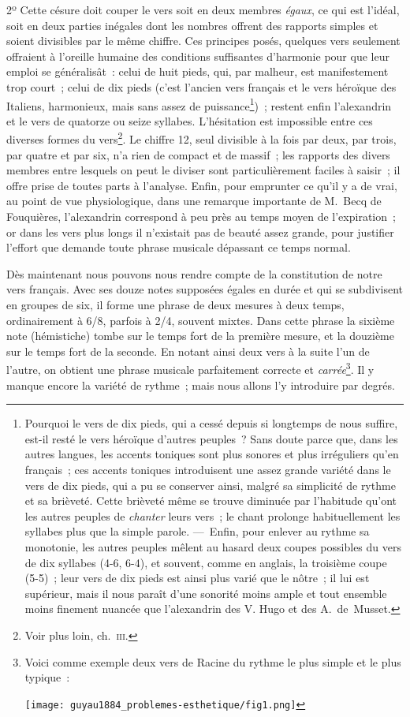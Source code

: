 \documentclass[french,twoside]{book} %
\begin{document}
2º Cette césure doit couper le vers soit en deux membres \emph{égaux}, ce qui est l’idéal, soit en deux parties inégales dont les nombres offrent des rapports simples et soient divisibles par le même chiffre.  Ces principes posés, quelques vers seulement offraient à l’oreille humaine des conditions suffisantes d’harmonie pour que leur emploi se généralisât : celui de huit pieds, qui, par malheur, est manifestement trop court ; celui de dix pieds (c’est l’ancien vers français et le vers héroïque des Italiens, harmonieux, mais sans assez de puissance\footnote{Pourquoi le vers de dix pieds, qui a cessé depuis si longtemps de nous suffire, est-il resté le vers héroïque d’autres peuples ? Sans doute parce que, dans les autres langues, les accents toniques sont plus sonores et plus irréguliers qu’en français ; ces accents toniques introduisent une assez grande variété dans le vers de dix pieds, qui a pu se conserver ainsi, malgré sa simplicité de rythme et sa brièveté. Cette brièveté même se trouve diminuée par l’habitude qu’ont les autres peuples de \emph{chanter} leurs vers ; le chant prolonge habituellement les syllabes plus que la simple parole. — Enfin, pour enlever au rythme sa monotonie, les autres peuples mêlent au hasard deux coupes possibles du vers de dix syllabes (4-6, 6-4), et souvent, comme en anglais, la troisième coupe (5-5) ; leur vers de dix pieds est ainsi plus varié que le nôtre ; il lui est supérieur, mais il nous paraît d’une sonorité moins ample et tout ensemble moins finement nuancée que l’alexandrin des V. Hugo et des A. de Musset.}) ; restent enfin l’alexandrin et le vers de quatorze ou seize syllabes. L’hésitation est impossible entre ces diverses formes du vers\footnote{Voir plus loin, ch. \textsc{iii}.}. Le chiffre 12, seul divisible à la fois par deux, par trois, par quatre et par six, n’a rien de compact et de massif ; les rapports des divers membres entre lesquels on peut le diviser sont particulièrement faciles à saisir ; il offre prise de toutes parts à l’analyse. Enfin, pour emprunter ce qu’il y a de vrai, au point de vue physiologique, dans une remarque importante de M. Becq de Fouquières, l’alexandrin correspond à peu près au temps moyen de l’expiration ; or dans les vers  plus longs il n’existait pas de beauté assez grande, pour justifier l’effort que demande toute phrase musicale dépassant ce temps normal.\par
Dès maintenant nous pouvons nous rendre compte de la constitution de notre vers français. Avec ses douze notes supposées égales en durée et qui se subdivisent en groupes de six, il forme une phrase de deux mesures à deux temps, ordinairement à 6/8, parfois à 2/4, souvent mixtes. Dans cette phrase la sixième note (hémistiche) tombe sur le temps fort de la première mesure, et la douzième sur le temps fort de la seconde. En notant ainsi deux vers à la suite l’un de l’autre, on obtient une phrase musicale parfaitement correcte et \emph{carrée}\footnote{\noindent Voici comme exemple deux vers de Racine du rythme le plus simple et le plus typique :\par
  \texttt{[image: guyau1884\_problemes-esthetique/fig1.png]}

}. Il y manque encore la variété de rythme ; mais nous allons l’y introduire par degrés.\par
\end{document}
